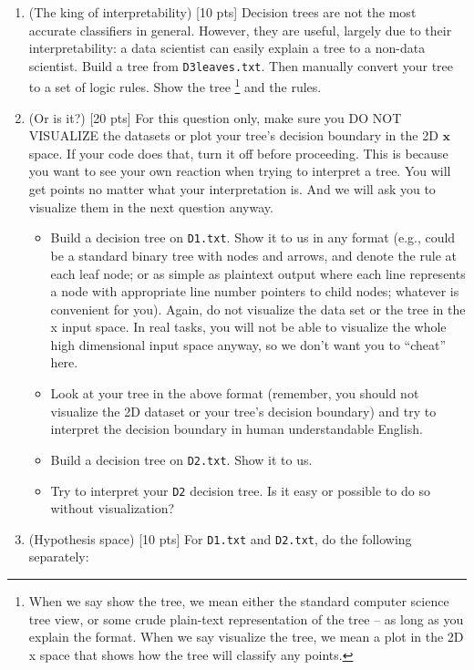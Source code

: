 \documentclass[a4paper]{article}
\theoremstyle{definition}
\def\x{\mathbf x}
\newcommand{\1}{\Ind}
\begin{document}
\begin{enumerate}
\item (The king of interpretability) [10 pts] Decision trees are not the most accurate classifiers in general. However, they are useful, largely due to their interpretability: a data scientist can easily explain a tree to a non-data scientist. Build a tree from {\tt D3leaves.txt}. Then manually convert your tree to a set of logic rules. Show the tree
\footnote{When we say show the tree, we mean either the standard computer science tree view, or some crude plain-text representation of the tree – as long as you explain the format. When we say visualize the tree, we mean a plot in the 2D x space that shows how the tree will classify any points. } and the rules. 
\item (Or is it?) [20 pts] For this question only, make sure you DO NOT VISUALIZE the datasets or plot your tree’s decision boundary in the 2D $\x$ space. If your code does that, turn it off before proceeding. This is because you want to see your own reaction when trying to interpret a tree. You will get points no matter what your interpretation is. And we will ask you to visualize them in the next question anyway. 
\begin{itemize}
\item Build a decision tree on  {\tt D1.txt}. Show it to us in any format (e.g., could be a standard binary tree with nodes and arrows, and denote the rule at each leaf node; or as simple as plaintext output where each line represents a node with appropriate line number pointers to child nodes; whatever is convenient for you). Again, do not visualize the data set or the tree in the x input space. In real tasks, you will not be able to visualize the whole high dimensional input space anyway, so we don’t want you to “cheat” here. 

\item Look at your tree in the above format (remember, you should not visualize the 2D dataset or your tree’s decision boundary) and try to interpret the decision boundary in human understandable English. 

\item Build a decision tree on {\tt D2.txt}. Show it to us. 
\item Try to interpret your {\tt D2} decision tree. Is it easy or possible to do so without visualization? 
\end{itemize}
\item (Hypothesis space) [10 pts] For {\tt D1.txt} and {\tt D2.txt}, do the following separately: 


\end{enumerate}
\end{document}
